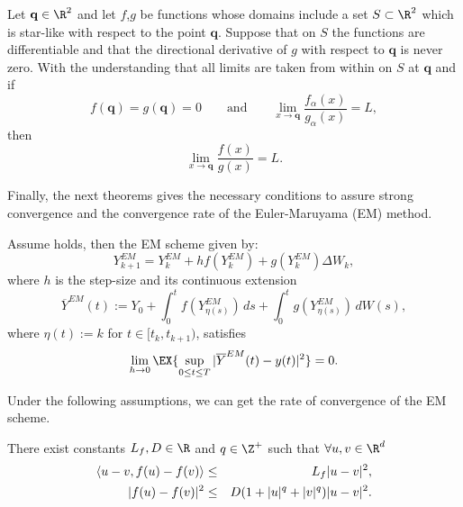 \begin{thm}\label{thm:Fine}
	Let $\mathbf{q}\in \R^2$ and let $f$,$g$ be functions whose domains include a set $S\subset \R^2$ which is 
	star-like 
	with  respect to the point $\mathbf{q}$. Suppose that on $S$ the functions are differentiable and that
	the directional derivative of $g$ with respect to $\mathbf{q}$ is never zero. With the understanding that all 
	limits are taken from within on $S$ at $\mathbf{q}$ and if
	$$f(\mathbf{q})=g(\mathbf{q})=0 \qquad \mbox{and} \qquad
				\displaystyle
				\lim_{x \to \mathbf{q}}
				\frac{f_{\alpha}(x)}{g_{\alpha}(x)} = L,$$
	then
	$$
		\lim_{x \to \mathbf{q}}
		\frac{f(x)}{g(x)} = L.
	$$
\end{thm}
 Finally, the next theorems gives the necessary conditions to assure strong convergence and 
 the convergence rate of the Euler-Maruyama (EM) 
 method.  
\begin{thm}\label{thm:HighamMaoStuart}
	Assume  holds, then the EM scheme given by: 
	\begin{equation}\label{eqn:EulerMaruyamaHigham}
	Y^{EM}_{k+1}= Y^{EM}_k+hf(Y^{EM}_k) + g(Y^{EM}_k)\Delta W_k,
    \end{equation} 
	where $h$ is the step-size and its
	continuous  extension
	\begin{equation}\label{extE}
	\overline{Y}^{EM}(t):=Y_0+\int_0^t f (Y^{EM}_{\eta(s)})\,ds+\int_0^t g(Y^{EM}_{\eta(s)})\,dW(s),
	\end{equation}
	where $\eta(t):=k$ for $t\in[t_k,t_{k+1})$, satisfies
	\begin{equation}
		\lim_{h\to 0}
		\EX{\sup_{0\leq t\leq T}|\overline{Y}^{EM}(t)-y(t)|^2}=0.
	\end{equation}
\end{thm}	
Under the following assumptions, we can get the rate of convergence of the EM scheme.
\begin{hypothesis}\label{PolynomialGrowth}
	There exist constants $L_f, D\in \R$ and $q \in \Z^+$ such that $\forall u,v \in \R^d$
	\begin{eqnarray}
		\left\langle u-v, f(u)-f(v)\right\rangle
			&\leq& L_f|u-v|^2, \nonumber \\
		|f(u) - f(v)|^2 
			&\leq& 
				D(1 + |u|^q +|v|^q) |u-v|^2.\nonumber
	\end{eqnarray}
\end{hypothesis}

